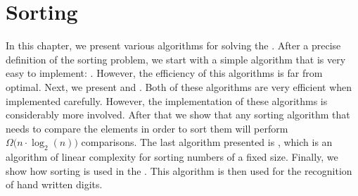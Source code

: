 \chapter{Sorting}
In this chapter, we present various algorithms for solving the .
After a precise definition of the sorting problem, we start with a simple algorithm
that is very easy to implement: .  However, the
efficiency of this algorithms is far from optimal.  Next, we present  and 
.  Both of these algorithms are very efficient when implemented carefully.
However, the implementation of these algorithms is considerably more involved.
After that we show that any sorting algorithm that needs to compare the elements in order to sort them will
perform $\Omega\bigl(n \cdot \log_2(n)\bigr)$ comparisons.  The last algorithm presented is , which is an
algorithm of linear complexity for sorting numbers of a fixed size.
Finally, we show how sorting is used in the .
This algorithm is then used for the recognition of hand written digits.

